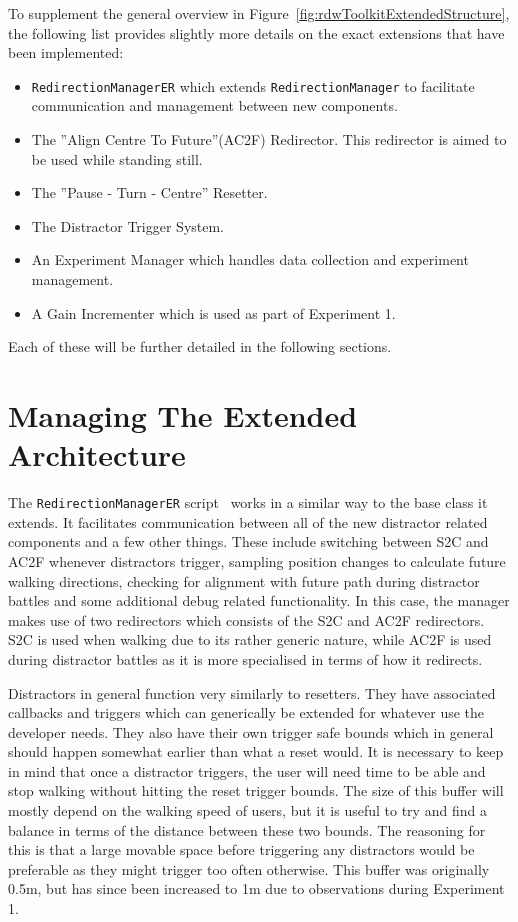 To supplement the general overview in Figure~\ref{fig:rdwToolkitExtendedStructure}, the following list provides slightly more details on the exact extensions that have been implemented:
\begin{itemize}
    \item \lstinline{RedirectionManagerER} which extends \lstinline{RedirectionManager} to facilitate communication and management between new components.
    \item The ''Align Centre To Future''(AC2F) Redirector. This redirector is aimed to be used while standing still.
    \item The ''Pause - Turn - Centre'' Resetter.
    \item The Distractor Trigger System.
    \item An Experiment Manager which handles data collection and experiment management.
    \item A Gain Incrementer which is used as part of Experiment 1.
\end{itemize}

Each of these will be further detailed in the following sections. 

\section{Managing The Extended Architecture}
The \lstinline{RedirectionManagerER} script~\cite{redirectionManagerER} works in a similar way to the base class it extends. It facilitates communication between all of the new distractor related components and a few other things. These include switching between S2C and AC2F whenever distractors trigger, sampling position changes to calculate future walking directions, checking for alignment with future path during distractor battles and some additional debug related functionality. In this case, the manager makes use of two redirectors which consists of the S2C and AC2F redirectors. S2C is used when walking due to its rather generic nature, while AC2F is used during distractor battles as it is more specialised in terms of how it redirects.

Distractors in general function very similarly to resetters. They have associated callbacks and triggers which can generically be extended for whatever use the developer needs. They also have their own trigger safe bounds which in general should happen somewhat earlier than what a reset would. It is necessary to keep in mind that once a distractor triggers, the user will need time to be able and stop walking without hitting the reset trigger bounds. The size of this buffer will mostly depend on the walking speed of users, but it is useful to try and find a balance in terms of the distance between these two bounds. The reasoning for this is that a large movable space before triggering any distractors would be preferable as they might trigger too often otherwise. This buffer was originally 0.5m, but has since been increased to 1m due to observations during Experiment 1.

